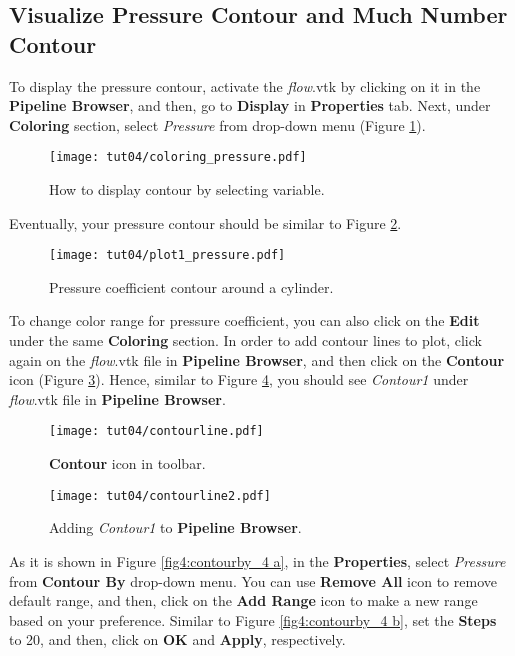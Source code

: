 \subsection{Visualize Pressure Contour and Much Number Contour}
To display the pressure contour, activate the \textit{flow}.vtk by clicking on it in the \textbf{Pipeline Browser}, and then, go to \textbf{Display} in \textbf{Properties} tab. Next, under \textbf{Coloring} section, select \textit{Pressure} from drop-down menu (Figure \ref{fig4:pressure_coloring_4}).
\begin{figure}[htbp]
    \centering
    \texttt{[image: tut04/coloring\_pressure.pdf]}
    \caption{How to display contour by selecting variable.}
    \label{fig4:pressure_coloring_4}
\end{figure}
Eventually, your pressure contour should be similar to Figure \ref{fig4:pressure_plot1_4}.
\begin{figure}[htbp]
    \centering
    \texttt{[image: tut04/plot1\_pressure.pdf]}
    \caption{Pressure coefficient contour around a cylinder.}
    \label{fig4:pressure_plot1_4}
\end{figure}
To change color range for pressure coefficient, you can also click on the \textbf{Edit} under the same \textbf{Coloring} section. In order to add contour lines to plot, click again on the \textit{flow}.vtk file in \textbf{Pipeline Browser}, and then click on the \textbf{Contour} icon (Figure \ref{fig4:contourline1_4}). Hence, similar to Figure \ref{fig4:contourline2_4}, you should see \textit{Contour1} under \textit{flow}.vtk file in \textbf{Pipeline Browser}. 
\begin{figure}[htbp]
    \centering
    \texttt{[image: tut04/contourline.pdf]}
    \caption{\textbf{Contour} icon in toolbar.}
    \label{fig4:contourline1_4}
\end{figure}
\begin{figure}[htbp]
    \centering
    \texttt{[image: tut04/contourline2.pdf]}
    \caption{Adding \textit{Contour1} to \textbf{Pipeline Browser}.}
    \label{fig4:contourline2_4}
\end{figure}
As it is shown in Figure \ref{fig4:contourby_4 a}, in the \textbf{Properties}, select \textit{Pressure} from \textbf{Contour By} drop-down menu. You can use \textbf{Remove All} icon to remove default range, and then, click on the \textbf{Add Range} icon to make a new range based on your preference. Similar to Figure \ref{fig4:contourby_4 b}, set the \textbf{Steps} to 20, and then, click on \textbf{OK} and \textbf{Apply}, respectively.
